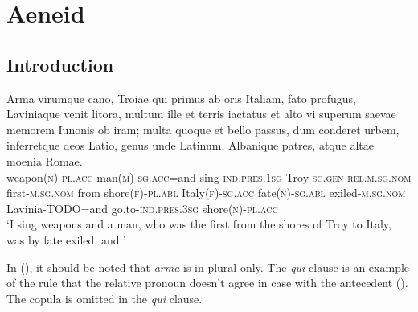 \documentclass[a4paper, oneside]{report}
\newcommand{\form}[1]{\emph{#1}}
\newcommand*{\category}[1]{\textsc{#1}}
\newcommand{\translate}[1]{`#1'}
\begin{document}
\section{Aeneid}

\subsection{Introduction}



\begin{exe}
    \ex\label{ex:text.aeneid.1.1} \gll Arma virumque cano, Troiae qui primus ab oris
    Italiam, fato profugus, Laviniaque venit litora, 
    multum ille et terris iactatus et alto
    vi superum saevae memorem Iunonis ob iram;
    multa quoque et bello passus, dum conderet urbem,  
    inferretque deos Latio, genus unde Latinum,
    Albanique patres, atque altae moenia Romae. \\
    weapon(\category{n})-\category{pl}.\category{acc} 
    man(\category{m})-\category{sg}.\category{acc}=and 
    sing-\category{ind}.\category{pres}.\category{1sg}
    Troy-\category{sc}.\category{gen} 
    \category{rel}.\category{m}.\category{sg}.\category{nom}
    first-\category{m}.\category{sg}.\category{nom} 
    from shore(\category{f})-\category{pl}.\category{abl} 
    Italy(\category{f})-\category{sg}.\category{acc} 
    fate(\category{n})-\category{sg}.\category{abl} 
    exiled-\category{m}.\category{sg}.\category{nom} 
    Lavinia-TODO=and  
    go.to-\category{ind}.\category{pres}.\category{3sg} 
    shore(\category{n})-\category{pl}.\category{acc} \\
    \glt \translate{I sing weapons and a man, 
    who was the first from the shores of Troy to Italy, 
    was by fate exiled, 
    and }
\end{exe}

In (),
it should be noted that \form{arma} is in plural only.
The \form{qui} clause is an example of the rule 
that the relative pronoun doesn't agree in case 
with the antecedent ().
The copula is omitted in the \form{qui} clause.




\end{document}
